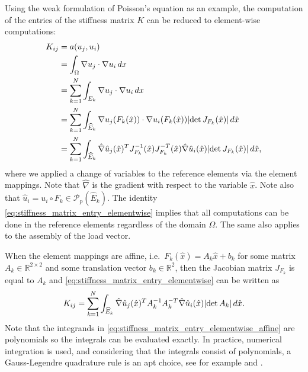 \documentclass[english, 12pt, a4paper, sci, utf8, a-2b, online]{aaltothesis}
\theoremstyle{definition}
\theoremstyle{plain}
\DeclarePairedDelimiter\abs{\lvert}{\rvert}
\newcommand*\diff{\mathop{}\!d}
\numberwithin{equation}{section}
\begin{document}
Using the weak formulation of Poisson's equation as an example,
the computation of the entries of the stiffness matrix $K$ can be reduced to element-wise
computations:
\begin{align}
    K_{ij}
    &= a(u_j, u_i) \nonumber \\
    &= \int_{\Omega} \nabla u_j \cdot \nabla u_i \diff x \nonumber \\
    &= \sum_{k=1}^{N} \int_{E_k} \nabla u_j \cdot \nabla u_i \diff x \nonumber \\
    &= \sum_{k=1}^{N} \int_{\widehat{E}_k}
        \nabla u_j (F_k(\hat{x})) \cdot \nabla u_i (F_k(\hat{x})) \abs{\det J_{F_k} (\hat{x})}
            \diff \hat{x} \nonumber \\
    \label{eq:stiffness_matrix_entry_elementwise}
    &= \sum_{k=1}^{N} \int_{\widehat{E}_k}
            \hat{\nabla} \hat{u}_j(\hat{x})^T
            J_{F_k}^{-1}(\hat{x}) J_{F_k}^{-T}(\hat{x})
            \hat{\nabla} \hat{u}_i(\hat{x})
            \abs{\det J_{F_k} (\hat{x})} \diff \hat{x},
\end{align}
where we applied a change of variables to the reference elements via the element mappings.
Note that $\hat{\nabla}$ is the gradient with respect to the variable $\hat{x}$.
Note also that $\hat{u}_i = u_i \circ F_k \in \mathcal{P}_p(\widehat{E}_k)$.
The identity \eqref{eq:stiffness_matrix_entry_elementwise} implies that all computations
can be done in the reference elements regardless of the domain $\Omega$.
The same also applies to the assembly of the load vector.

When the element mappings are affine, i.e.\ $F_k(\hat{x}) = A_k \hat{x} + b_k$
for some matrix $A_k \in \mathbb{R}^{2 \times 2}$ and
some translation vector $b_k \in \mathbb{R}^2$,
then the Jacobian matrix $J_{F_k}$ is equal to $A_k$ and 
\eqref{eq:stiffness_matrix_entry_elementwise} can be written as
\begin{equation}
    \label{eq:stiffness_matrix_entry_elementwise_affine}
    K_{ij} = \sum_{k=1}^{N} \int_{\widehat{E}_k}
        \hat{\nabla} \hat{u}_j(\hat{x})^T A_k^{-1} A_k^{-T} \hat{\nabla} \hat{u}_i(\hat{x})
            \abs{\det A_k} \diff \hat{x}.
\end{equation}
Note that the integrands in \eqref{eq:stiffness_matrix_entry_elementwise_affine}
are polynomials so the integrals can be evaluated exactly.
In practice, numerical integration is used, and considering that the integrals consist of
polynomials, a Gauss-Legendre quadrature rule is an apt choice, see for example
\cite{Hussain2012AppropriateGQ} and \cite{islam2009}.
\end{document}
